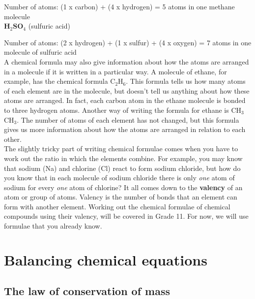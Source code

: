 Number of atoms: (1 x carbon) + (4 x hydrogen) = 5 atoms in one methane molecule\\

\textbf{H$_2$SO$_{4}$} (sulfuric acid)

Number of atoms: (2 x hydrogen) + (1 x sulfur) + (4 x oxygen) = 7 atoms in one molecule of sulfuric acid\\

A chemical formula may also give information about how the atoms are arranged in a molecule if it is written in a particular way. A molecule of ethane, for example, has the chemical formula C$_{2}$H$_{6}$. This formula tells us how many atoms of each element are in the molecule, but doesn't tell us anything about how these atoms are arranged. In fact, each carbon atom in the ethane molecule is bonded to three hydrogen atoms. Another way of writing the formula for ethane is CH$_{3}$CH$_{3}$. The number of atoms of each element has not changed, but this formula gives us more information about how the atoms are arranged in relation to each other.\\

The slightly tricky part of writing chemical formulae comes when you have to work out the ratio in which the elements combine. For example, you may know that sodium (Na) and chlorine (Cl) react to form sodium chloride, but how do you know that in each molecule of sodium chloride there is only \textit{one} atom of sodium for every \textit{one} atom of chlorine? It all comes down to the \textbf{valency} of an atom or group of atoms. Valency is the number of bonds that an element can form with another element. Working out the chemical formulae of chemical compounds using their valency, will be covered in Grade 11. For now, we will use formulae that you already know.








\section{Balancing chemical equations}
\label{sec:repchange:balancing}

\subsection{The law of conservation of mass}

